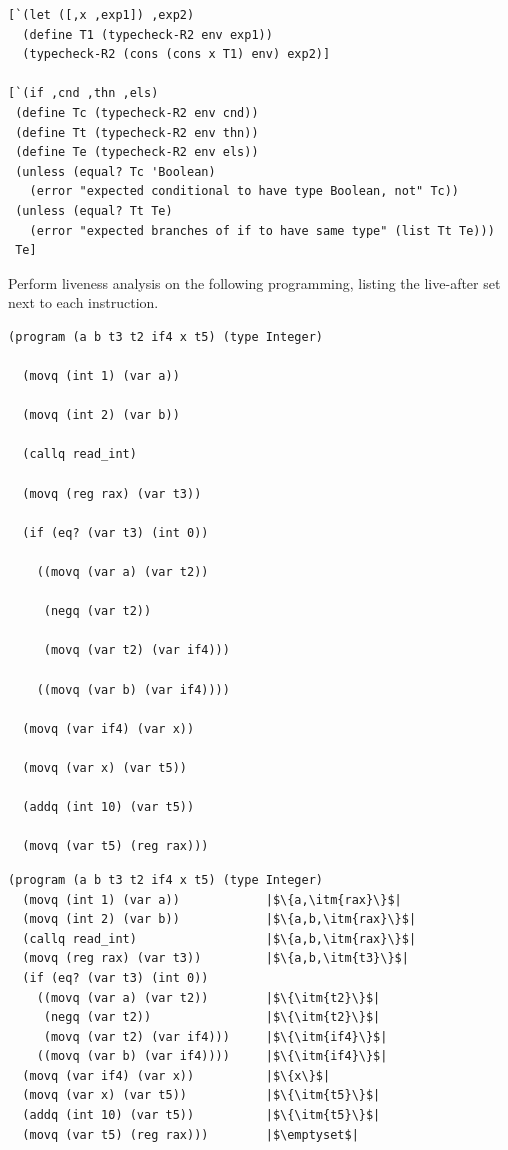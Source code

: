 \documentclass[12pt,answers]{exam}
\newcommand{\itm}[1]{\ensuremath{\mathit{#1}}}
\begin{document}
\begin{questions}
\begin{solution}
\begin{lstlisting}
[`(let ([,x ,exp1]) ,exp2)
  (define T1 (typecheck-R2 env exp1))
  (typecheck-R2 (cons (cons x T1) env) exp2)]

[`(if ,cnd ,thn ,els)
 (define Tc (typecheck-R2 env cnd))
 (define Tt (typecheck-R2 env thn))
 (define Te (typecheck-R2 env els))
 (unless (equal? Tc 'Boolean)
   (error "expected conditional to have type Boolean, not" Tc))
 (unless (equal? Tt Te)
   (error "expected branches of if to have same type" (list Tt Te)))
 Te]
\end{lstlisting}
\end{solution}

\question[10] Perform liveness analysis on the following programming,
listing the live-after set next to each instruction.

\begin{lstlisting}
(program (a b t3 t2 if4 x t5) (type Integer)

  (movq (int 1) (var a))

  (movq (int 2) (var b))

  (callq read_int)

  (movq (reg rax) (var t3))

  (if (eq? (var t3) (int 0))

    ((movq (var a) (var t2))

     (negq (var t2))

     (movq (var t2) (var if4)))

    ((movq (var b) (var if4))))

  (movq (var if4) (var x))

  (movq (var x) (var t5))

  (addq (int 10) (var t5))

  (movq (var t5) (reg rax)))
\end{lstlisting}

\begin{solution}
\begin{lstlisting}
(program (a b t3 t2 if4 x t5) (type Integer)
  (movq (int 1) (var a))            |$\{a,\itm{rax}\}$|
  (movq (int 2) (var b))            |$\{a,b,\itm{rax}\}$|
  (callq read_int)                  |$\{a,b,\itm{rax}\}$|
  (movq (reg rax) (var t3))         |$\{a,b,\itm{t3}\}$|
  (if (eq? (var t3) (int 0))
    ((movq (var a) (var t2))        |$\{\itm{t2}\}$|
     (negq (var t2))                |$\{\itm{t2}\}$|
     (movq (var t2) (var if4)))     |$\{\itm{if4}\}$|
    ((movq (var b) (var if4))))     |$\{\itm{if4}\}$|
  (movq (var if4) (var x))          |$\{x\}$|
  (movq (var x) (var t5))           |$\{\itm{t5}\}$|
  (addq (int 10) (var t5))          |$\{\itm{t5}\}$|
  (movq (var t5) (reg rax)))        |$\emptyset$|
\end{lstlisting}
\end{solution}


\end{questions}
\end{document}
